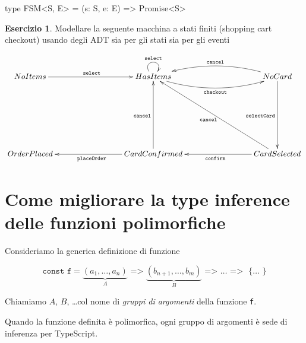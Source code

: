 \documentclass[12pt]{article}
\theoremstyle{definition}
\newtheorem{exercise}{Esercizio}[subsection]
\newenvironment{code}
  {\vspace{0.5cm} \VerbatimEnvironment\begin{typescriptcode}}
  {\end{typescriptcode} \vspace{0.2cm}}
\begin{document}
\begin{code}
type FSM<S, E> = (s: S, e: E) => Promise<S>
\end{code}

\begin{exercise}
Modellare la seguente macchina a stati finiti (shopping cart checkout) usando degli ADT sia per gli stati sia per gli eventi

\[
\xymatrixrowsep{3cm}
\xymatrixcolsep{3cm}
\xymatrix{
  NoItems \ar[r]^{\texttt{select}} & HasItems \ar@(ul,ur)^{\texttt{select}} \ar@/_0.5cm/[r]_{\texttt{checkout}} & NoCard \ar[d]_{\texttt{selectCard}} \ar@/_0.5cm/[l]_{\texttt{cancel}} \\
  OrderPlaced & CardConfirmed \ar[u]^{\texttt{cancel}} \ar[l]^{\texttt{placeOrder}} & CardSelected \ar[ul]^{\texttt{cancel}} \ar[l]^{\texttt{confirm}} \\
}
\]
\end{exercise}

\newpage
\section{Come migliorare la type inference delle funzioni polimorfiche}

Consideriamo la generica definizione di funzione

$$
\texttt{const f} = \underbrace{(a_1, \ldots, a_n)}_A \texttt{ => } \underbrace{(b_{n + 1}, \ldots, b_m)}_B \texttt{ => } \ldots \texttt{ => } \texttt{ \{ } \ldots \texttt{ \} }
$$

Chiamiamo $A$, $B$, \ldots col nome di \emph{gruppi di argomenti} della funzione \texttt{f}.

Quando la funzione definita è polimorfica, ogni gruppo di argomenti è sede di inferenza per TypeScript.
\end{document}
